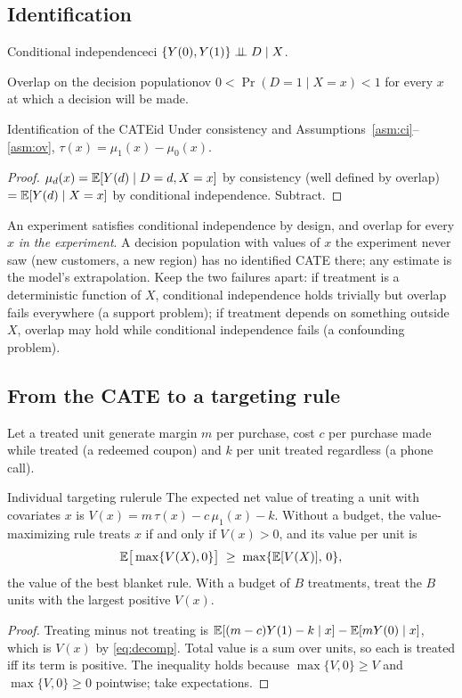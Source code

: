 \documentclass[11pt]{article}
\begin{document}
\subsection{Identification}

\begin{assum}{Conditional independence}{ci}
$\{Y(0), Y(1)\} \perp\!\!\!\perp D \mid X$.
\end{assum}
\begin{assum}{Overlap on the decision population}{ov}
$0 < \Pr(D=1 \mid X=x) < 1$ for every $x$ at which a decision will be made.
\end{assum}
\begin{prop}{Identification of the CATE}{id}
Under consistency and Assumptions~\ref{asm:ci}--\ref{asm:ov}, $\tau(x) = \mu_1(x) - \mu_0(x)$.
\end{prop}
\begin{proof}
$\mu_d(x) = \mathbb{E}[Y(d) \mid D=d, X=x]$ by consistency (well defined by overlap) $= \mathbb{E}[Y(d) \mid X=x]$ by
conditional independence. Subtract.
\end{proof}

An experiment satisfies conditional independence by design, and overlap for every $x$ \emph{in the
experiment}. A decision population with values of $x$ the experiment never saw (new customers, a new
region) has no identified CATE there; any estimate is the model's extrapolation. Keep the two failures
apart: if treatment is a deterministic function of $X$, conditional independence holds trivially but overlap
fails everywhere (a support problem); if treatment depends on something outside $X$, overlap may hold while
conditional independence fails (a confounding problem).

\subsection{From the CATE to a targeting rule}

Let a treated unit generate margin $m$ per purchase, cost $c$ per purchase made while treated (a redeemed
coupon) and $k$ per unit treated regardless (a phone call).

\begin{prop}{Individual targeting rule}{rule}
The expected net value of treating a unit with covariates $x$ is $V(x) = m\,\tau(x) - c\,\mu_1(x) - k$.
Without a budget, the value-maximizing rule treats $x$ if and only if $V(x) > 0$, and its value per unit is
\[
  \mathbb{E}\big[\max\{V(X), 0\}\big] \;\ge\; \max\{\mathbb{E}[V(X)],\, 0\},
\]
the value of the best blanket rule. With a budget of $B$ treatments, treat the $B$ units with the largest
positive $V(x)$.
\end{prop}
\begin{proof}
Treating minus not treating is $\mathbb{E}[(m-c)Y(1) - k \mid x] - \mathbb{E}[mY(0) \mid x]$, which is $V(x)$ by
\eqref{eq:decomp}. Total value is a sum over units, so each is treated iff its term is positive. The inequality
holds because $\max\{V,0\} \ge V$ and $\max\{V,0\} \ge 0$ pointwise; take expectations.
\end{proof}
\end{document}

